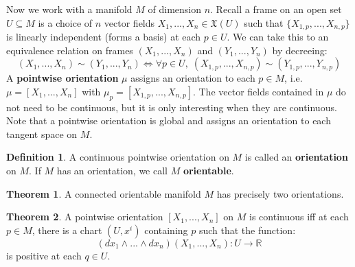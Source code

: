\documentclass[11pt, oneside]{article}   	%
\theoremstyle{definition}
\newtheorem{definition}{Definition}[section]
\newtheorem{theorem}{Theorem}[section]
\begin{document}
Now we work with a manifold $M$ of dimension $n$. Recall a frame on an open set $U\subseteq M$ is a choice of $n$
vector fields $X_1, ..., X_n\in\mathfrak X(U)$ such that $\{X_{1, p}, ..., X_{n, p}\}$ is linearly independent (forms a basis) 
at each $p\in U$. We can take this to an equivalence relation on frames $(X_1, ..., X_n)$ and $(Y_1, ..., Y_n)$ by decreeing:
\begin{equation}
	(X_1, ..., X_n)\sim (Y_1, ..., Y_n)\iff \forall p\in U, \;(X_{1, p}, ..., X_{n, p})\sim (Y_{1, p}, ..., Y_{n, p})
\end{equation}
A \textbf{pointwise orientation} $\mu$ assigns an orientation to each $p\in M$, i.e. $\mu = [X_1, ..., X_n]$ with $\mu_p = 
[X_{1, p}, ..., X_{n, p}]$. The vector fields contained in $\mu$ do not need to be continuous, but it is only interesting when 
they are continuous. Note that a pointwise orientation is global and assigns an orientation to each tangent space on $M$. 
\begin{definition}
	A continuous pointwise orientation on $M$ is called an \textbf{orientation} on $M$. If $M$ has an orientation, we call 
	$M$ \textbf{orientable}. 
\end{definition}
\begin{theorem}
	A connected orientable manifold $M$ has precisely two orientations. 
\end{theorem}
\begin{theorem}
	A pointwise orientation $[X_1, ..., X_n]$ on $M$ is continuous iff at each $p\in M$, there is a chart $(U, x^i)$ containing 
	$p$ such that the function:
	\begin{equation}
		(dx_1\wedge ...\wedge dx_n)(X_1, ..., X_n) : U\rightarrow\mathbb R
	\end{equation}
	is positive at each $q\in U$. 
\end{theorem}
\end{document}
